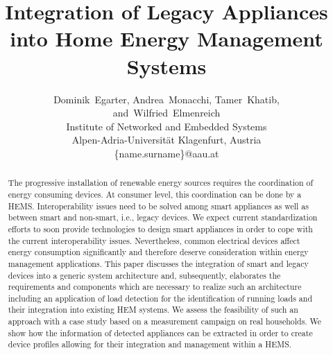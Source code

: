 \documentclass{article}
\begin{document}
\title{Integration of Legacy Appliances into Home Energy Management Systems}



 \author{
Dominik~Egarter, Andrea~Monacchi, Tamer~Khatib, \\
and~Wilfried~Elmenreich\\[0.3em]
{\small Institute of Networked and Embedded Systems}\\
{\small Alpen-Adria-Universit\"at Klagenfurt, Austria}\\
{\small\{name.surname\}@aau.at}
 }
\maketitle

\begin{abstract}
The progressive installation of renewable energy sources requires the coordination of energy consuming devices.
At consumer level, this coordination can be done by a \ac{HEMS}.
Interoperability issues need to be solved among smart appliances as well as between smart and non-smart, i.e., legacy devices.
We expect current standardization efforts to soon provide technologies to design smart appliances in order to cope with the current interoperability issues.
Nevertheless, common electrical devices affect energy consumption significantly and therefore deserve consideration within energy management applications.
This paper discusses the integration of smart and legacy devices into a generic system architecture and, subsequently, elaborates the requirements and components which are necessary to realize such an architecture including an application of load detection for the identification of running loads and their integration into existing HEM systems.
We assess the feasibility of such an approach with a case study based on a measurement campaign on real households.
We show how the information of detected appliances can be extracted in order to create device profiles allowing for their integration and management within a \ac{HEMS}.
\end{abstract}





\lstset{ basicstyle=\ttfamily\scriptsize,         numbers=left,                   stepnumber=0,                   }

\pagestyle{headings}  
\end{document}
